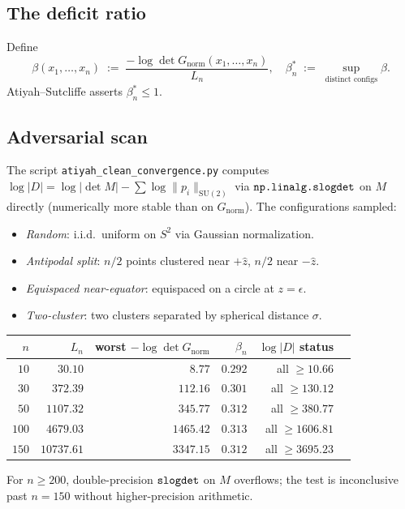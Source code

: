 \documentclass[11pt,a4paper]{article}
\begin{document}
\subsection{The deficit ratio}
Define
\[
\beta(x_1, \ldots, x_n) \;:=\; \frac{-\log \det G_{\mathrm{norm}}(x_1, \ldots, x_n)}{L_n},
\quad
\beta_n^* \;:=\; \sup_{\text{distinct configs}} \beta.
\]
Atiyah--Sutcliffe asserts $\beta_n^* \le 1$.

\subsection{Adversarial scan}\label{sec:scan}

The script \verb|atiyah_clean_convergence.py| computes
$\log|D| = \log|\det M| - \sum \log \|p_i\|_{\mathrm{SU}(2)}$
via $\verb|np.linalg.slogdet|$ on $M$ directly (numerically more stable than
on $G_{\mathrm{norm}}$). The configurations sampled:
\begin{itemize}
\item \emph{Random}: i.i.d.\ uniform on $S^2$ via Gaussian normalization.
\item \emph{Antipodal split}: $n/2$ points clustered near $+\hat z$, $n/2$ near $-\hat z$.
\item \emph{Equispaced near-equator}: equispaced on a circle at $z = \epsilon$.
\item \emph{Two-cluster}: two clusters separated by spherical distance $\sigma$.
\end{itemize}

\begin{center}
\begin{tabular}{rrrrrr}
\toprule
$n$ & $L_n$ & worst $-\log\det G_{\mathrm{norm}}$ & $\beta_n$ & $\log|D|$ status \\
\midrule
$10$  & $30.10$    & $8.77$    & $0.292$ & all $\ge 10.66$ \\
$30$  & $372.39$   & $112.16$  & $0.301$ & all $\ge 130.12$ \\
$50$  & $1107.32$  & $345.77$  & $0.312$ & all $\ge 380.77$ \\
$100$ & $4679.03$  & $1465.42$ & $0.313$ & all $\ge 1606.81$ \\
$150$ & $10737.61$ & $3347.15$ & $0.312$ & all $\ge 3695.23$ \\
\bottomrule
\end{tabular}
\end{center}

For $n \ge 200$, double-precision $\verb|slogdet|$ on $M$ overflows; the test
is inconclusive past $n = 150$ without higher-precision arithmetic.
\end{document}
